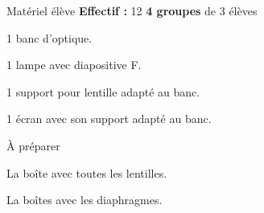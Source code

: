 
\begin{boiteMateriel}{Matériel élève}
  \textbf{Effectif :} 12
  \qq{}\qq{}
  \flecheLongue \textbf{4 groupes} de 3 élèves

  \begin{protocole}
    \item 1 banc d'optique.
    \item 1 lampe avec diapositive F.
    \item 1 support pour lentille adapté au banc.
    \item 1 écran avec son support adapté au banc.
  \end{protocole}
\end{boiteMateriel}


\begin{boiteMateriel}{À préparer}
  \begin{protocole}
    \item La boîte avec toutes les lentilles.
    \item La boîtes avec les diaphragmes.
  \end{protocole}
\end{boiteMateriel}